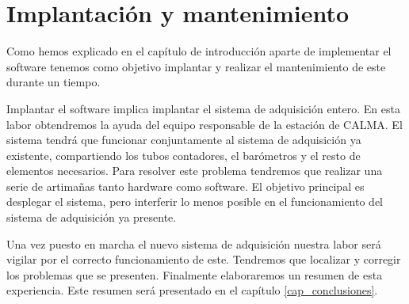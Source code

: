 \section{Implantación y mantenimiento}
	Como hemos explicado en el capítulo de introducción aparte de implementar el software tenemos como objetivo implantar y realizar el
	mantenimiento de este durante un tiempo. 
	\par
	Implantar el software implica implantar el sistema de adquisición entero. En esta labor obtendremos la ayuda del equipo responsable de la
	estación de CALMA. El sistema tendrá que funcionar conjuntamente al sistema de adquisición ya existente, compartiendo los tubos contadores, el
	barómetros y el resto de elementos necesarios. Para resolver este problema tendremos que realizar una serie de artimañas tanto hardware como
	software. El objetivo principal es desplegar el sistema, pero interferir lo menos posible en el funcionamiento del sistema de adquisición ya
	presente. 
	\par
	Una vez puesto en marcha el nuevo sistema de adquisición nuestra labor será vigilar por el correcto funcionamiento de este. Tendremos que
	localizar y corregir los problemas que se presenten. Finalmente elaboraremos un resumen de esta experiencia. Este resumen será presentado en
	el capítulo \ref{cap_conclusiones}.
